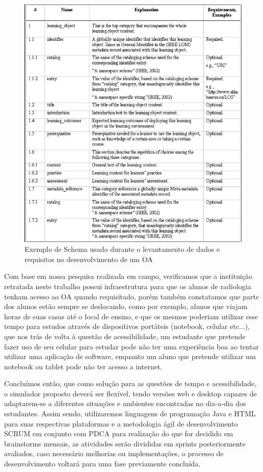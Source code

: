 \documentclass[12pt,openright,oneside,a4paper,english,french,spanish,brazil]{unifil}
\begin{document}
\begin{figure}[htb]
	\centering
	\includegraphics[scale=0.5]{images/Schema.png}
	\caption{Exemplo de Schema usado durante o levantamento de dados e requisitos no desenvolvimento de um OA}
	\label{img:schema}
\end{figure}

Com base em nossa pesquisa realizada em campo, verificamos que a instituição retratada neste trabalho possui infraestrutura para que os alunos de radiologia tenham acesso ao OA quando requisitado, porém também constatamos que parte dos alunos estão sempre se deslocando, como por exemplo, alunos que viajam horas de suas casas até o local de ensino, e que os mesmos poderiam utilizar esse tempo para estudos através de dispositivos portáteis (notebook, celular etc...), que nos trás de volta à questão de acessibilidade, um estudante que pretende fazer uso de seu celular para estudar pode não ter uma experiência boa ao tentar utilizar uma aplicação de software, enquanto um aluno que pretende utilizar um notebook ou tablet pode não ter acesso a internet.

Concluímos então, que como solução para as questões de tempo e acessibilidade, o simulador proposto deverá ser flexível, tendo versões web e desktop capazes de adaptarem-se a diferentes situações e ambientes encontradas no dia-a-dia dos estudantes. Assim sendo, utilizaremos linguagens de programação Java e HTML para suas respectivas plataformas e a metodologia ágil de desenvolvimento SCRUM em conjunto com PDCA para realização do que for decidido em brainstorms mensais, as atividades serão divididas em sprints posteriormente avaliados, caso necessário melhorias ou implementações, o processo de desenvolvimento voltará para uma fase previamente concluída.
\end{document}
